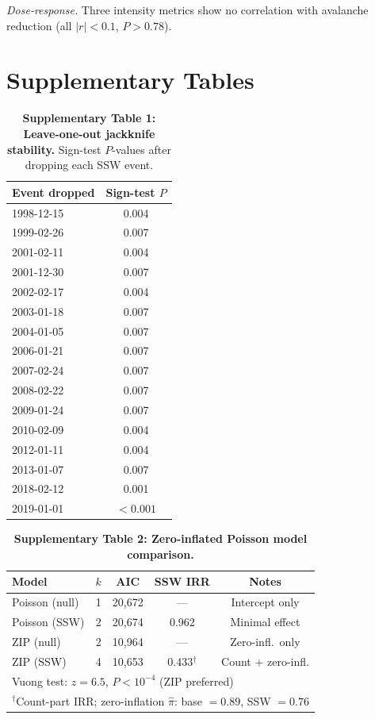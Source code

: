 \documentclass[11pt,a4paper]{article}
\begin{document}
\textit{Dose-response.} Three intensity metrics show no correlation with avalanche reduction (all $|r| < 0.1$, $P > 0.78$).

\section{Supplementary Tables}

\begin{table}[!ht]
\centering
\caption{\textbf{Supplementary Table 1: Leave-one-out jackknife stability.}
Sign-test $P$-values after dropping each SSW event.}
\label{stab:loo}
\small
\begin{tabular}{lc}
\toprule
Event dropped & Sign-test $P$ \\
\midrule
1998-12-15 & 0.004 \\
1999-02-26 & 0.007 \\
2001-02-11 & 0.004 \\
2001-12-30 & 0.007 \\
2002-02-17 & 0.004 \\
2003-01-18 & 0.007 \\
2004-01-05 & 0.007 \\
2006-01-21 & 0.007 \\
2007-02-24 & 0.007 \\
2008-02-22 & 0.007 \\
2009-01-24 & 0.007 \\
2010-02-09 & 0.004 \\
2012-01-11 & 0.004 \\
2013-01-07 & 0.007 \\
2018-02-12 & 0.001 \\
2019-01-01 & $< 0.001$ \\
\bottomrule
\end{tabular}
\end{table}

\begin{table}[!ht]
\centering
\caption{\textbf{Supplementary Table 2: Zero-inflated Poisson model comparison.}}
\label{stab:zip}
\small
\begin{tabular}{lcccc}
\toprule
Model & $k$ & AIC & SSW IRR & Notes \\
\midrule
Poisson (null) & 1 & 20{,}672 & --- & Intercept only \\
Poisson (SSW) & 2 & 20{,}674 & 0.962 & Minimal effect \\
ZIP (null) & 2 & 10{,}964 & --- & Zero-infl.\ only \\
ZIP (SSW) & 4 & 10{,}653 & 0.433$^\dagger$ & Count + zero-infl. \\
\midrule
\multicolumn{5}{l}{Vuong test: $z = 6.5$, $P < 10^{-4}$ (ZIP preferred)} \\
\multicolumn{5}{l}{$^\dagger$Count-part IRR; zero-inflation $\hat{\pi}$: base $= 0.89$, SSW $= 0.76$} \\
\bottomrule
\end{tabular}
\end{table}
\end{document}
